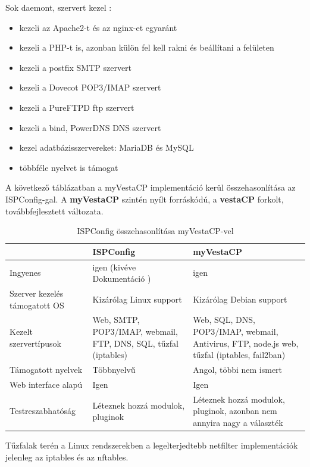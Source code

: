 Sok daemont, szervert kezel \cite{ispconfig2}:
\begin{itemize}
	\item kezeli az Apache2-t és az nginx-et egyaránt
	\item kezeli a PHP-t is, azonban külön fel kell rakni és beállítani a felületen
	\item kezeli a postfix SMTP szervert
	\item kezeli a Dovecot POP3/IMAP szervert
	\item kezeli a PureFTPD ftp szervert
	\item kezeli a bind, PowerDNS DNS szervert
	\item kezel adatbázisszervereket: MariaDB és MySQL
	\item többféle nyelvet is támogat
\end{itemize}

A következő táblázatban a myVestaCP implementáció kerül összehasonlítása az ISPConfig-gal.
A \textbf{myVestaCP} szintén nyílt forráskódú, a \textbf{vestaCP} forkolt, továbbfejlesztett változata.

\begin{table}[h]
\centering
\caption{ISPConfig \cite{ispconfig2} összehasonlítása myVestaCP-vel \cite{myvestacp}}
\label{tab:ispconfig}
\begin{tabularx}{\linewidth}{l|L|L}
 & ISPConfig & myVestaCP \\
\hline
Ingyenes & igen (kivéve Dokumentáció \cite{ispconfig_doc}) & igen \\
\hline
Szerver kezelés támogatott OS & Kizárólag Linux support & Kizárólag Debian support \\
\hline
Kezelt szervertípusok & Web, SMTP, POP3/IMAP, webmail, FTP, DNS, SQL, tűzfal (iptables) & Web, SQL, DNS, POP3/IMAP, webmail, Antivirus, FTP, node.js web, tűzfal (iptables, fail2ban) \cite{vestacpdocs} \\
\hline
Támogatott nyelvek & Többnyelvű & Angol, többi nem ismert \\
\hline
Web interface alapú & Igen & Igen \\
\hline
Testreszabhatóság & Léteznek hozzá modulok, pluginok & Léteznek hozzá modulok, pluginok, azonban nem annyira nagy a választék \\
\end{tabularx}
\end{table}

Tűzfalak terén a Linux rendszerekben a legelterjedtebb netfilter implementációk jelenleg az iptables és az nftables. 

